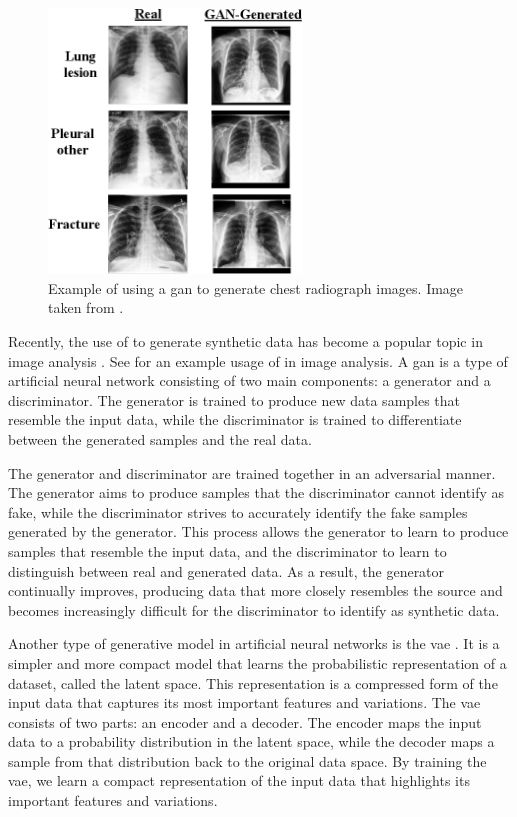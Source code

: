 \documentclass[12pt, letterpaper]{article}
\begin{document}
\begin{figure}[t]
    \centering
    \includegraphics[width=0.6\textwidth]{figures/gan-xray.png}
    \caption{Example of using a \acrfull{gan} to generate chest radiograph images. Image taken from \cite{sundaram_gan-based_2021}.}
    \label{fig:gan-xray}
\end{figure}

Recently, the use of  to generate synthetic data has become a popular topic in image analysis \cite{pavan_kumar_generative_2021}. See  for an example usage of  in image analysis. A \acrshort{gan} is a type of artificial neural network consisting of two main components: a generator and a discriminator. The generator is trained to produce new data samples that resemble the input data, while the discriminator is trained to differentiate between the generated samples and the real data.

The generator and discriminator are trained together in an adversarial manner. The generator aims to produce samples that the discriminator cannot identify as fake, while the discriminator strives to accurately identify the fake samples generated by the generator. This process allows the generator to learn to produce samples that resemble the input data, and the discriminator to learn to distinguish between real and generated data. As a result, the generator continually improves, producing data that more closely resembles the source and becomes increasingly difficult for the discriminator to identify as synthetic data.

Another type of generative model in artificial neural networks is the \acrfull{vae} \cite{kingma_auto-encoding_2013}. It is a simpler and more compact model that learns the probabilistic representation of a dataset, called the latent space. This representation is a compressed form of the input data that captures its most important features and variations. The \acrshort{vae} consists of two parts: an encoder and a decoder. The encoder maps the input data to a probability distribution in the latent space, while the decoder maps a sample from that distribution back to the original data space. By training the \acrshort{vae}, we learn a compact representation of the input data that highlights its important features and variations.
\end{document}
